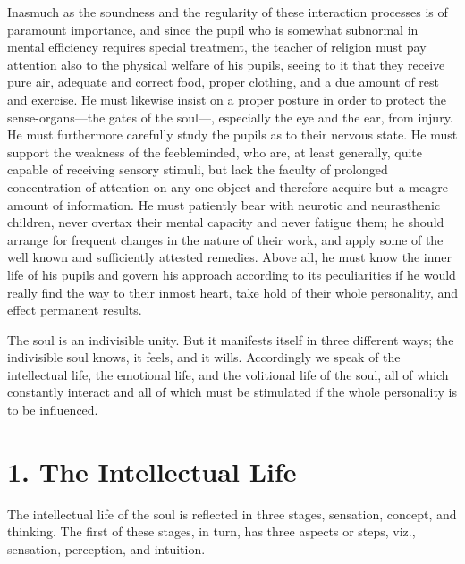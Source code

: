 Inasmuch as the soundness and the regularity of these interaction processes is of paramount importance, and since the pupil who is somewhat subnormal in mental efficiency requires special treatment, the teacher of religion must pay attention also to the physical welfare of his pupils, seeing to it that they receive pure air, adequate and correct food, proper clothing, and a due amount of rest and exercise. He must likewise insist on a proper posture in order to protect the sense-organs—the gates of the soul—, especially the eye and the ear, from injury. He must furthermore carefully study the pupils as to their nervous state. He must support the weakness of the feebleminded, who are, at least generally, quite capable of receiving sensory stimuli, but lack the faculty of prolonged concentration of attention on any one object and therefore acquire but a meagre amount of information. He must patiently bear with neurotic and neurasthenic children, never overtax their mental capacity and never fatigue them; he should arrange for frequent changes in the nature of their work, and apply some of the well known and sufficiently attested remedies. Above all, he must know the inner life of his pupils and govern his approach according to its peculiarities if he would really find the way to their inmost heart, take hold of their whole personality, and effect permanent results.

The soul is an indivisible unity. But it manifests itself in three different ways; the indivisible soul knows, it feels, and it wills. Accordingly we speak of the intellectual life, the emotional life, and the volitional life of the soul, all of which constantly interact and all of which must be stimulated if the whole personality is to be influenced.
\section{1. The Intellectual Life}

The intellectual life of the soul is reflected in three stages, sensation, concept, and thinking. The first of these stages, in turn, has three aspects or steps, viz., sensation, perception, and intuition.

